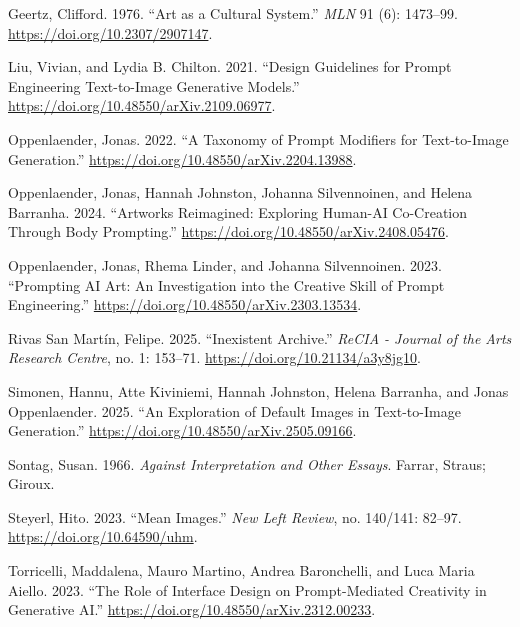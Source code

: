 \documentclass[
  11pt,
  letterpaper,
]{article}
\newlength{\cslhangindent}
\newenvironment{CSLReferences}[2] %
 {\begin{list}{}{%
  \setlength{\itemindent}{0pt}
  \setlength{\leftmargin}{0pt}
  \setlength{\parsep}{0pt}
  \ifodd #1
   \setlength{\leftmargin}{\cslhangindent}
   \setlength{\itemindent}{-1\cslhangindent}
  \fi
  \setlength{\itemsep}{#2\baselineskip}}}
 {\end{list}}
\begin{document}
\label{refs}
\begin{CSLReferences}{1}{0}
Geertz, Clifford. 1976. {``Art as a Cultural System.''} \emph{MLN} 91
(6): 1473--99. \url{https://doi.org/10.2307/2907147}.

Liu, Vivian, and Lydia B. Chilton. 2021. {``Design Guidelines for Prompt
Engineering Text-to-Image Generative Models.''}
\url{https://doi.org/10.48550/arXiv.2109.06977}.

Oppenlaender, Jonas. 2022. {``A Taxonomy of Prompt Modifiers for
Text-to-Image Generation.''}
\url{https://doi.org/10.48550/arXiv.2204.13988}.

Oppenlaender, Jonas, Hannah Johnston, Johanna Silvennoinen, and Helena
Barranha. 2024. {``Artworks Reimagined: Exploring Human-AI Co-Creation
Through Body Prompting.''}
\url{https://doi.org/10.48550/arXiv.2408.05476}.

Oppenlaender, Jonas, Rhema Linder, and Johanna Silvennoinen. 2023.
{``Prompting AI Art: An Investigation into the Creative Skill of Prompt
Engineering.''} \url{https://doi.org/10.48550/arXiv.2303.13534}.

Rivas San Martín, Felipe. 2025. {``Inexistent Archive.''} \emph{ReCIA -
Journal of the Arts Research Centre}, no. 1: 153--71.
\url{https://doi.org/10.21134/a3y8jg10}.

Simonen, Hannu, Atte Kiviniemi, Hannah Johnston, Helena Barranha, and
Jonas Oppenlaender. 2025. {``An Exploration of Default Images in
Text-to-Image Generation.''}
\url{https://doi.org/10.48550/arXiv.2505.09166}.

Sontag, Susan. 1966. \emph{Against Interpretation and Other Essays}.
Farrar, Straus; Giroux.

Steyerl, Hito. 2023. {``Mean Images.''} \emph{New Left Review}, no.
140/141: 82--97. \url{https://doi.org/10.64590/uhm}.

Torricelli, Maddalena, Mauro Martino, Andrea Baronchelli, and Luca Maria
Aiello. 2023. {``The Role of Interface Design on Prompt-Mediated
Creativity in Generative AI.''}
\url{https://doi.org/10.48550/arXiv.2312.00233}.

\end{CSLReferences}
\end{document}
